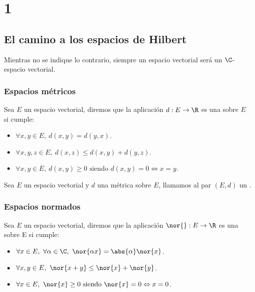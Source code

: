 \chapter{1}\label{ch:1}

\section{El camino a los espacios de Hilbert}
Mientras no se indique lo contrario, siempre un espacio vectorial será un $\C$-espacio vectorial.

\subsection{Espacios métricos}
\begin{definicion}
  \label{distancia}
  Sea $E$ un espacio vectorial, diremos que la aplicación $d:E \rightarrow \R$ es una  sobre $E$ si cumple:
  \begin{itemize}
    \item $\forall x,y \in E,\ d(x,y)=d(y,x)$.
    \item $\forall x,y,z \in E,\ d(x,z)\leq d(x, y)+d(y, z)$.
    \item $\forall x, y \in E,\ d(x,y)\geq 0 \text{ siendo } d(x,y)=0\Leftrightarrow x = y$.
  \end{itemize}
\end{definicion}

\begin{definicion}
  \label{espacio_metrico}
  Sea $E$ un espacio vectorial y $d$ una métrica sobre $E$, llamamos al par $(E, d)$ un .
\end{definicion}

\subsection{Espacios normados}
\begin{definicion}
  \label{norma}
  Sea $E$ un espacio vectorial, diremos que la aplicación $\nor{}:E \rightarrow \R$ es una  sobre E si cumple:
  \begin{itemize}
    \item $\forall x \in E,\ \forall\alpha\in\C,\ \nor{\alpha x}=\abs{\alpha}\nor{x}$.
    \item $\forall x,y \in E,\ \nor{x+y}\leq\nor{x}+\nor{y}$.
    \item $\forall x \in E,\ \nor{x}\geq 0 \text{ siendo } \nor{x}=0\Leftrightarrow x = 0$.
  \end{itemize}
\end{definicion}


